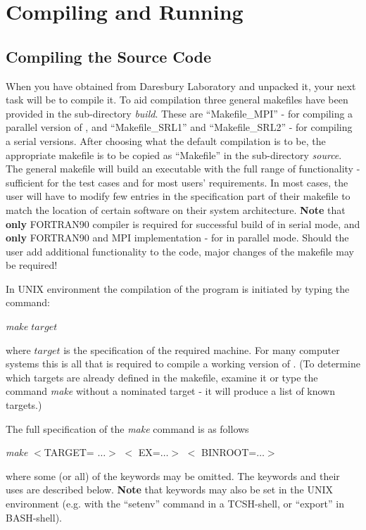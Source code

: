 \section{Compiling and Running \D}

\subsection{Compiling the Source Code}
\label{compilation}

When you have obtained \D from Daresbury Laboratory and unpacked it,
your next task will be to compile it.  To aid compilation three
general makefiles have been provided in the sub-directory {\em
build}.  These are ``Makefile\_MPI'' - for compiling a parallel
version of \D, and ``Makefile\_SRL1'' and ``Makefile\_SRL2'' - for
compiling a serial versions.  After choosing what the default compilation
is to be, the appropriate makefile is to be copied as ``Makefile'' in
the sub-directory {\em source}.  The general \D makefile will build an
executable with the full range of functionality - sufficient for the
test cases and for most users' requirements.  In most cases, the user
will have to modify few entries in the specification part of their
makefile to match the location of certain software on their system architecture.
{\bf Note} that {\bf only} FORTRAN90 compiler is required for
successful build of \D in serial mode, and {\bf only} FORTRAN90
and MPI implementation - for \D in parallel mode.  Should the user
add additional functionality to the code, major changes of the
makefile may be required!

In UNIX environment the compilation of the program is initiated by
typing the command:

{\em make} $target$

\noindent where $target$ is the specification of the required
machine.  For many computer systems this is all that is required
to compile a working version of \D. (To determine which targets
are already defined in the makefile, examine it or type the
command {\em make} without a nominated target - it will produce a
list of known targets.)

The full specification of the {\em make} command is as follows

{\em make} $<$TARGET= $\ldots >$ $<$ EX=$\ldots >$ $<$
BINROOT=$\ldots >$

\noindent where some (or all) of the keywords may be omitted.
The keywords and their uses are described below.  {\bf Note} that
keywords may also be set in the UNIX environment (e.g. with the
``setenv'' command in a TCSH-shell, or ``export'' in BASH-shell).

